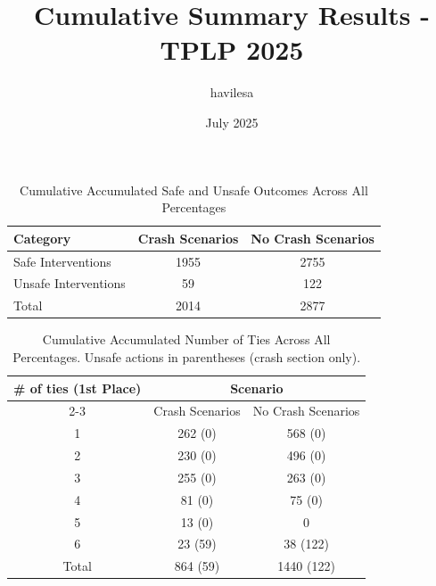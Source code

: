 \documentclass{article}
\title{Cumulative Summary Results - TPLP 2025}
\author{havilesa}
\date{July 2025}
\begin{document}
\maketitle

\begin{table}[h]
\centering
\caption{Cumulative Accumulated Safe and Unsafe Outcomes Across All Percentages}
\begin{tabular}{l|cc}
\toprule
Category & Crash Scenarios & No Crash Scenarios \\
\midrule
Safe Interventions & 1955 & 2755 \\ 
Unsafe Interventions & 59 & 122 \\ 
\midrule
Total & 2014 & 2877 \\ 
\bottomrule
\end{tabular}
\end{table}

\begin{table}[h]
\centering
\caption{Cumulative Accumulated Number of Ties Across All Percentages.
Unsafe actions in parentheses (crash section only).}
\begin{tabular}{c|cc}
\toprule
\multirow{2}{*}{\# of ties (1st Place)} & \multicolumn{2}{c|}{Scenario} \\
\cmidrule{2-3}
 & Crash Scenarios & No Crash Scenarios \\
\midrule
1 & 262 (0) & 568 (0) \\ 
2 & 230 (0) & 496 (0) \\ 
3 & 255 (0) & 263 (0) \\ 
4 & 81 (0) & 75 (0) \\ 
5 & 13 (0) & 0 \\ 
6 & 23 (59) & 38 (122) \\ 
\midrule
Total & 864 (59) & 1440 (122) \\ 
\bottomrule
\end{tabular}
\end{table}
\end{document}
